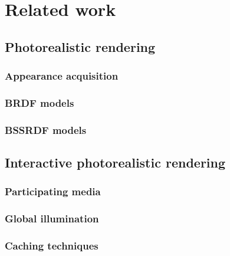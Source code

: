\chapter{Related work}
\label{sec:related}
\section{Photorealistic rendering}
\subsection{Appearance acquisition}
\subsection{BRDF models}
\subsection{BSSRDF models}

\section{Interactive photorealistic rendering}

\subsection{Participating media}
\subsection{Global illumination}
\subsection{Caching techniques}
